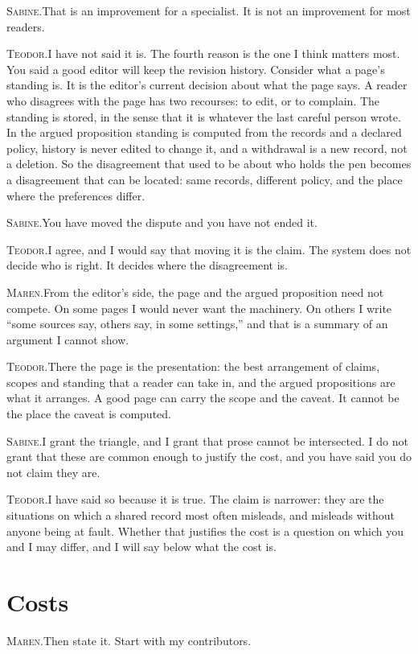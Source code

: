 \documentclass[11pt]{article}
\newcommand{\say}[2]{\par\noindent\textsc{#1.}\enspace #2\par}
\newcommand{\MA}[1]{\say{Maren}{#1}}
\newcommand{\TE}[1]{\say{Teodor}{#1}}
\newcommand{\SA}[1]{\say{Sabine}{#1}}
\begin{document}
\SA{That is an improvement for a specialist. It is not an improvement for most readers.}

\TE{I have not said it is. The fourth reason is the one I think matters most. You said a good editor will keep the revision history. Consider what a page's standing is. It is the editor's current decision about what the page says. A reader who disagrees with the page has two recourses: to edit, or to complain. The standing is stored, in the sense that it is whatever the last careful person wrote. In the argued proposition standing is computed from the records and a declared policy, history is never edited to change it, and a withdrawal is a new record, not a deletion. So the disagreement that used to be about who holds the pen becomes a disagreement that can be located: same records, different policy, and the place where the preferences differ.}

\SA{You have moved the dispute and you have not ended it.}

\TE{I agree, and I would say that moving it is the claim. The system does not decide who is right. It decides where the disagreement is.}

\MA{From the editor's side, the page and the argued proposition need not compete. On some pages I would never want the machinery. On others I write ``some sources say, others say, in some settings,'' and that is a summary of an argument I cannot show.}

\TE{There the page is the presentation: the best arrangement of claims, scopes and standing that a reader can take in, and the argued propositions are what it arranges. A good page can carry the scope and the caveat. It cannot be the place the caveat is computed.}

\SA{I grant the triangle, and I grant that prose cannot be intersected. I do not grant that these are common enough to justify the cost, and you have said you do not claim they are.}

\TE{I have said so because it is true. The claim is narrower: they are the situations on which a shared record most often misleads, and misleads without anyone being at fault. Whether that justifies the cost is a question on which you and I may differ, and I will say below what the cost is.}

\section{Costs}

\MA{Then state it. Start with my contributors.}
\end{document}
